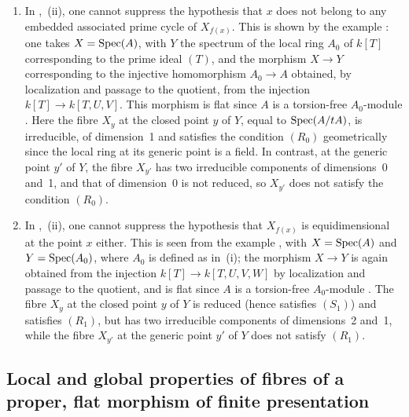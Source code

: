 \begin{remarks}[12.1.8]
\label{IV.12.1.8}
\begin{enumerate}[label=(\roman*)]
  \item In ,~(ii), one cannot suppress the hypothesis that $x$ does not belong to any embedded associated prime cycle of $X_{f(x)}$.
This is shown by the example : one takes $X=\operatorname{Spec}(A)$, with $Y$ the spectrum of the local ring $A_0$ of $k[T]$ corresponding to the prime ideal $(T)$, and the morphism $X\to Y$ corresponding to the injective homomorphism $A_0\to A$ obtained, by localization and passage to the quotient, from the injection $k[T]\to k[T,U,V]$.
This morphism is flat since $A$ is a torsion-free $A_0$-module .
Here the fibre $X_y$ at the closed point $y$ of $Y$, equal to $\operatorname{Spec}(A/tA)$, is irreducible, of dimension~1 and satisfies the condition $(R_0)$ geometrically since the local ring at its generic point is a field.
In contrast, at the generic point $y'$ of $Y$, the fibre $X_{y'}$ has two irreducible components of dimensions~0 and~1, and that of dimension~0 is not reduced, so $X_{y'}$ does not satisfy the condition $(R_0)$.

  \item In ,~(ii), one cannot suppress the hypothesis that $X_{f(x)}$ is equidimensional at the point $x$ either.
This is seen from the example , with $X=\operatorname{Spec}(A)$ and $Y=\operatorname{Spec}(A_0)$, where $A_0$ is defined as in~(i); the morphism $X\to Y$ is again obtained from the injection $k[T]\to k[T,U,V,W]$ by localization and passage to the quotient, and is flat since $A$ is a torsion-free $A_0$-module .
The fibre $X_y$ at the closed point $y$ of $Y$ is reduced (hence satisfies $(S_1)$) and satisfies $(R_1)$, but has two irreducible components of dimensions~2 and~1, while the fibre $X_{y'}$ at the generic point $y'$ of $Y$ does not satisfy $(R_1)$.
\end{enumerate}
\end{remarks}


\subsection{Local and global properties of fibres of a proper, flat morphism of finite presentation}
\label{subsection:IV.12.2}


